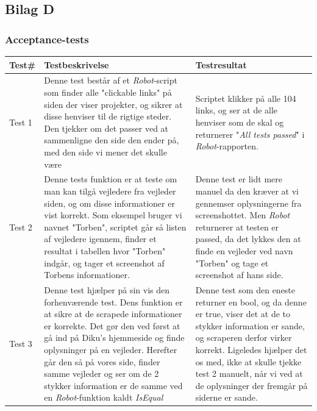 \documentclass[12pt]{article}
\begin{document}
\newpage
\subsection{Bilag D}
\label{sec:bilag_tests}
\subsubsection*{Acceptance-tests}
\begin{center}
	\begin{tabular}{|p{}|p{}|p{}|}
		\hline
	\textbf{Test\#} & \textbf{Testbeskrivelse} & \textbf{Testresultat} \\ \hline

	Test 1 & Denne test består af et \textit{Robot}-script som finder alle "clickable links" på siden der viser projekter, og sikrer at disse henviser til de rigtige steder. Den tjekker om det passer ved at sammenligne den side den ender på, med den side vi mener det skulle være & Scriptet klikker på alle 104 links, og ser at de alle henviser som de skal og returnerer "\textit{All tests passed}"{} i \textit{Robot}-rapporten.\\ \hline

	Test 2 & Denne tests funktion er at teste om man kan tilgå vejledere fra vejleder siden, og om disse informationer er vist korrekt. Som eksempel bruger vi navnet "Torben", scriptet går så listen af vejledere igennem, finder et resultat i tabellen hvor "Torben" indgår, og tager et screenshot af Torbens informationer. & Denne test er lidt mere manuel da den kræver at vi gennemser oplysningerne fra screenshottet. Men \textit{Robot} returnerer at testen er passed, da det lykkes den at finde en vejleder ved navn "Torben" og tage et screenshot af hans side.\\ \hline

	Test 3 & Denne test hjælper på sin vis den forhenværende test. Dens funktion er at sikre at de scrapede informationer er korrekte. Det gør den ved først at gå ind på Diku's hjemmeside og finde oplysninger på en vejleder. Herefter går den så på vores side, finder samme vejleder og ser om de 2 stykker information er de samme ved en \textit{Robot}-funktion kaldt \textit{IsEqual} & Denne test som den eneste returner en bool, og da denne er true, viser det at de to stykker information er sande, og scraperen derfor virker korrekt. \newline
	Ligeledes hjælper det os med, ikke at skulle tjekke test 2 manuelt, når vi ved at de oplysninger der fremgår på siderne er sande. \\ \hline
	\end{tabular}
\end{center}
\newpage
\end{document}
